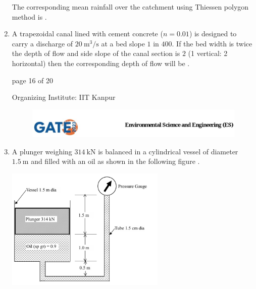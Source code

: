 \documentclass[journal,12pt,onecolumn]{IEEEtran}
\theoremstyle{remark}
\begin{document}
\begin{enumerate}[start=1, label={Q\arabic*.}]
The corresponding mean rainfall over the catchment using Thiessen polygon method is \underline{\hspace{2cm}} . \hfill{}

\item A trapezoidal canal lined with cement concrete ($n = 0.01$) is designed to carry a discharge of $20\ \text{m}^3/\text{s}$ at a bed slope $1$ in $400$. If the bed width is twice the depth of flow and side slope of the canal section is $2$ (1 vertical: 2 horizontal) then the corresponding depth of flow will be \underline{\hspace{2cm}} . \hfill{}
\vfill
\begin{center}
{\Large page 16 of 20}
\end{center}
\RaggedRight
{\color{orange}
{\Large Organizing Institute: IIT Kanpur}}
\newpage
\begin{figure}
    
    \includegraphics[width=1\linewidth]{figs/latex.jpg}
    
\end{figure}
\item A plunger weighing $314\ \text{kN}$ is balanced in a cylindrical vessel of diameter $1.5\ \text{m}$ and filled with an oil  as shown in the following figure .

\begin{center}
\includegraphics[width=0.6\textwidth]{figs/img 5 (2).jpeg}
\end{center}


\end{enumerate}
\end{document}
